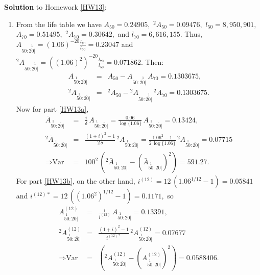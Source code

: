 \documentclass[11pt,fleqn,oneside]{book}
\begin{document}
\noindent \textbf{Solution} to Homework \ref{HW13}:
\footnotesize
\begin{enumerate}
\item From the life table we have $A_{50} = 0.24905,$ $^2{A_{50}} = 0.09476,$ $l_{50} = 8,950,901,$ $A_{70} = 0.51495,$ $^2{A_{70}} = 0.30642,$ and $l_{70} = 6,616,155.$ Thus, $A_{50:\stackrel{1}{\overline{20}|}} = (1.06)^{-20} \frac{l_{70}}{l_{50}} = 0.23047$ and  $^2A_{50:\stackrel{1}{\overline{20}|}} = ((1.06)^2)^{-20} \frac{l_{70}}{l_{50}} = 0.071862.$ Then:
\begin{eqnarray*}
A_{\stackrel{1}{50}:\overline{20}|} &=& A_{50} - A_{50:\stackrel{1}{\overline{20}|}}\, A_{70} = 0.1303675,\\
^2A_{\stackrel{1}{50}:\overline{20}|} &=& {^2A}_{50} - {^2A}_{50:\stackrel{1}{\overline{20}|}}\, {^2A}_{70} = 0.1303675.
\end{eqnarray*}
Now for part \ref{HW13a}, 
\begin{eqnarray*}
\bar{A}_{\stackrel{1}{50}:\overline{20}|} &=& \frac{i}{\delta} \,{A}_{\stackrel{1}{50}:\overline{20}|} = \frac{0.06}{\log\{1.06\}}\,{A}_{\stackrel{1}{50}:\overline{20}|} = 0.13424,\\
{^2\bar{A}}_{\stackrel{1}{50}:\overline{20}|} &=& \frac{(1+i)^2-1}{2\,\delta} \, {^2{A}}_{\stackrel{1}{50}:\overline{20}|} = \frac{1.06^2-1}{2\,\log\{1.06\}}\,{^2{A}}_{\stackrel{1}{50}:\overline{20}|} = 0.07715\\
\Rightarrow \text{Var} &=& 100^2 \,\left({^2\bar{A}}_{\stackrel{1}{50}:\overline{20}|}  - \left(\bar{A}_{\stackrel{1}{50}:\overline{20}|} \right)^2 \right)= 591.27.
\end{eqnarray*}
For part \ref{HW13b}, on the other hand, $i^{(12)} = 12\,\left(1.06^{1/12} - 1\right) = 0.05841$ and $i^{(12)*} = 12\,\left((1.06^2)^{1/12} - 1 \right) = 0.1171,$ so 
\begin{eqnarray*}
A^{(12)}_{\stackrel{1}{50}:\overline{20}|} &=& \frac{i}{i^{(12)}} \,{A}_{\stackrel{1}{50}:\overline{20}|} = 0.13391,\\
{^2A}^{(12)}_{\stackrel{1}{50}:\overline{20}|} &=& \frac{(1+i)^2-1}{i^{(12)*}} \, {^2{A}}^{(12)}_{\stackrel{1}{50}:\overline{20}|} =  0.07677\\
\Rightarrow \text{Var} &=& \left({^2A}^{(12)}_{\stackrel{1}{50}:\overline{20}|}  - \left(A^{(12)}_{\stackrel{1}{50}:\overline{20}|} \right)^2 \right)= 0.0588406.
\end{eqnarray*}
\end{enumerate}

\normalsize
\end{document}
